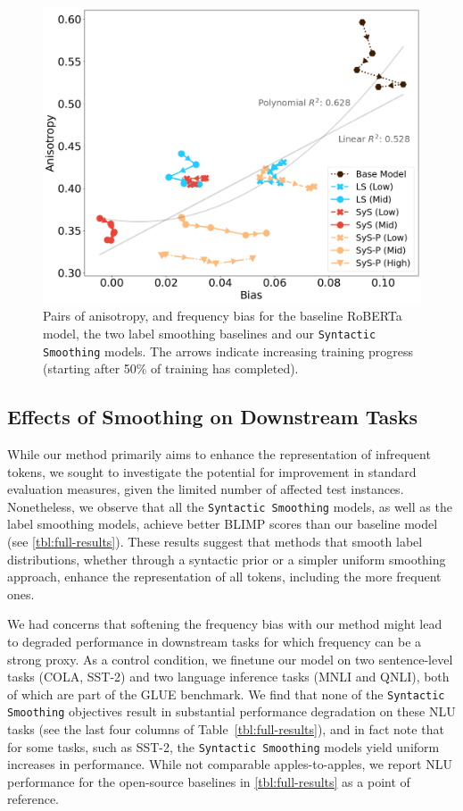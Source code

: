 \begin{figure}[ht!]
    \centering
    \includegraphics[width=0.75\linewidth]{chapters/syntatic-smoothing/figures/bias-vs-anisotropy.png}
    \caption{Pairs of anisotropy, and frequency bias for the baseline RoBERTa model, the two label smoothing baselines and our \texttt{Syntactic Smoothing} models. The arrows indicate increasing training progress (starting after 50\% of training has completed).}
    \label{fig:bias-anisotropy-correlation}
\end{figure}

\subsection{Effects of Smoothing on Downstream Tasks}
While our method primarily aims to enhance the representation of infrequent tokens, we sought to investigate the potential for improvement in standard evaluation measures, given the limited number of affected test instances. Nonetheless, we observe that all the \texttt{Syntactic Smoothing} models, as well as the label smoothing models, achieve better BLIMP scores than our baseline model (see \cref{tbl:full-results}). These results suggest that methods that smooth label distributions, whether through a syntactic prior or a simpler uniform smoothing approach, enhance the representation of all tokens, including the more frequent ones.

We had concerns that softening the frequency bias with our method might lead to degraded performance in downstream tasks for which frequency can be a strong proxy. As a control condition, we finetune our model on two sentence-level tasks (COLA, SST-2) and two language inference tasks (MNLI and QNLI), both of which are part of the GLUE \citep{wang2018glue} benchmark. We find that none of the \texttt{Syntactic Smoothing} objectives result in substantial performance degradation on these NLU tasks (see the last four columns of Table~\cref{tbl:full-results}), and in fact note that for some tasks, such as SST-2, the \texttt{Syntactic Smoothing} models yield uniform increases in performance. While not comparable apples-to-apples, we report NLU performance for the open-source baselines in \cref{tbl:full-results} as a point of reference. 

